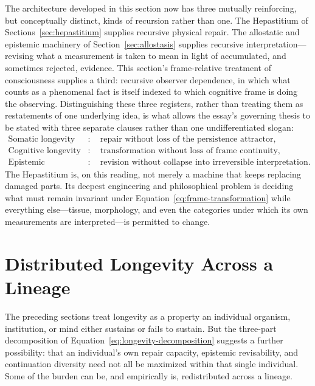 \documentclass[12pt]{article}
\begin{document}
The architecture developed in this section now has three mutually reinforcing, but conceptually distinct, kinds of recursion rather than one. The Hepastitium of Sections~\ref{sec:hepastitium} supplies recursive physical repair. The allostatic and epistemic machinery of Section~\ref{sec:allostasis} supplies recursive interpretation---revising what a measurement is taken to mean in light of accumulated, and sometimes rejected, evidence. This section's frame-relative treatment of consciousness supplies a third: recursive observer dependence, in which what counts as a phenomenal fact is itself indexed to which cognitive frame is doing the observing. Distinguishing these three registers, rather than treating them as restatements of one underlying idea, is what allows the essay's governing thesis to be stated with three separate clauses rather than one undifferentiated slogan:
\begin{equation}
\boxed{
\begin{aligned}
\text{Somatic longevity} &: \quad \text{repair without loss of the persistence attractor}, \\
\text{Cognitive longevity} &: \quad \text{transformation without loss of frame continuity}, \\
\text{Epistemic longevity} &: \quad \text{revision without collapse into irreversible interpretation}.
\end{aligned}}
\label{eq:three-longevities}
\end{equation}
The Hepastitium is, on this reading, not merely a machine that keeps replacing damaged parts. Its deepest engineering and philosophical problem is deciding what must remain invariant under Equation~\eqref{eq:frame-transformation} while everything else---tissue, morphology, and even the categories under which its own measurements are interpreted---is permitted to change.

\section{Distributed Longevity Across a Lineage}
\label{sec:lineage}

The preceding sections treat longevity as a property an individual organism, institution, or mind either sustains or fails to sustain. But the three-part decomposition of Equation~\eqref{eq:longevity-decomposition} suggests a further possibility: that an individual's own repair capacity, epistemic revisability, and continuation diversity need not all be maximized within that single individual. Some of the burden can be, and empirically is, redistributed across a lineage.
\end{document}
